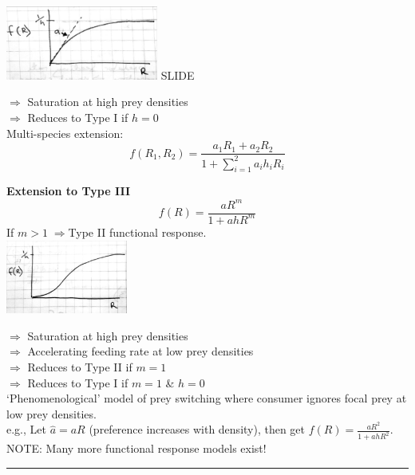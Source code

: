 \documentclass{article}
\newcommand{\note}[1]{\colorbox{gray!30}{#1}}
\newcommand{\ind}{\-\hspace{1cm}}
\begin{document}
\includegraphics[width=5cm]{figs/FR_T2.pdf} \note{SLIDE}

\ind $\Rightarrow$ Saturation at high prey densities\\
\ind $\Rightarrow$ Reduces to Type I if $h=0$\\

Multi-species extension:\\
\begin{equation*}
	f(R_1,R_2)=\frac{a_1 R_1 + a_2 R_2}{1+\sum_{i=1}^2 a_i h_i R_i}
\end{equation*}

\textbf{Extension to Type III}
\begin{equation*}
	f(R)=\frac{aR^m}{1+ahR^m}
\end{equation*}
\ind If $m>1\; \Rightarrow $Type II functional response.\\
\includegraphics[width=4cm]{figs/FR_T3.pdf}

\ind $\Rightarrow$ Saturation at high prey densities\\
\ind $\Rightarrow$ Accelerating feeding rate at low prey densities\\
\ind $\Rightarrow$ Reduces to Type II if $m=1$\\
\ind $\Rightarrow$ Reduces to Type I if $m=1$ \& $h=0$\\

`Phenomenological' model of prey switching where consumer ignores focal prey at low prey densities.\\
e.g., Let $\hat{a} = aR$ (preference increases with density), then get $f(R)=\frac{aR^2}{1+ahR^2}$.\\

\note{NOTE:}  Many more functional response models exist!

\rule[0.5ex]{\linewidth}{1pt}
\pagebreak
\end{document}
